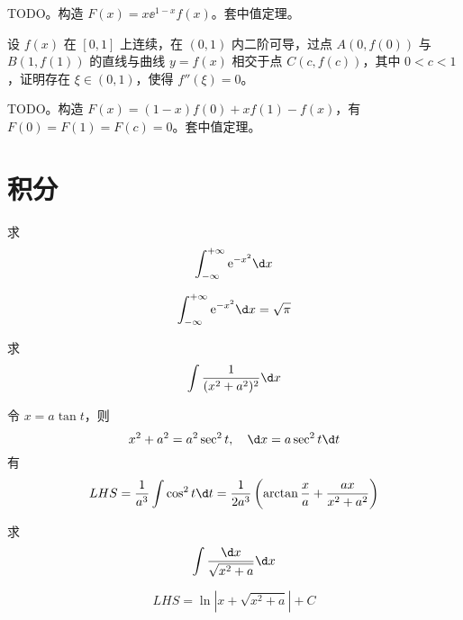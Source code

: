 \begin{solution}
	TODO。构造 $F(x) = x \ee^{1-x} f(x)$。套中值定理。
\end{solution}

\begin{problem}[000013]
设 $f(x)$ 在 $[0, 1]$ 上连续，在 $(0, 1)$ 内二阶可导，过点 $A(0, f(0))$ 与 $B(1, f(1))$ 的直线与曲线 $y=f(x)$ 相交于点 $C(c, f(c))$，其中 $0 < c < 1$，证明存在 $\xi \in (0, 1)$，使得 $f''(\xi) = 0$。
\end{problem}

\begin{solution}
	TODO。构造 $F(x) = (1-x)f(0) + xf(1) - f(x)$，有 $F(0) = F(1) = F(c) = 0$。套中值定理。
\end{solution}

\section{积分}

\begin{problem}[000008]
求
\[ \int_{-\infty}^{+\infty} \ee^{-x^2}\d x \]
\end{problem}
\begin{solution}
	\[ \int_{-\infty}^{+\infty} \ee^{-x^2}\d x = \sqrt{\uppi} \]
\end{solution}

\begin{problem}[000014]
求
\[ \int \frac{1}{(x^2+a^2)^2} \d x \]
\end{problem}
\begin{solution}
	令 $x = a \tan t$，则
	\[ x^2 + a^2 = a^2 \sec^2 t, \quad \d x = a \sec^2 t \d t \]
	有
	\[ LHS =  \frac{1}{a^3}\int \cos^2 t \d t = \frac{1}{2a^3} \left( \arctan \frac{x}{a} + \frac{ax}{x^2+a^2} \right) \]
\end{solution}


\begin{problem}[000015]
求
\[ \int \frac{\d x}{\sqrt{x^2 + a}} \d x \]
\end{problem}
\begin{solution}
	\[ LHS =  \ln |x + \sqrt{x^2+a}| + C \]
\end{solution}
